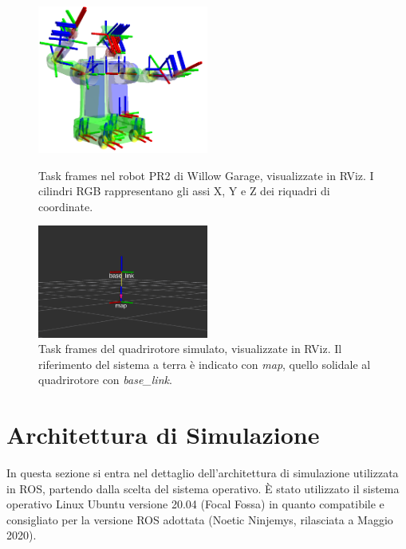 \begin{figure}[H]
	\begin{center}
	
	\includegraphics[width=0.5\textwidth]{gfx/tfROS}
    \caption[Task frames del robot PR2 di Willow Garage, in \acs{RViz}.]{Task frames nel robot PR2 di Willow Garage, visualizzate in \acs{RViz}. I cilindri RGB rappresentano gli assi X, Y e Z dei riquadri di coordinate.}
    \label{fig:tf_ROS}
    
    \vspace{30mm}

	\includegraphics[width=0.5\textwidth]{gfx/ROS/rqt_rviz}
	\caption[Task frames del quadrirotore simulato, in \acs{RViz}.]{Task frames del quadrirotore simulato, visualizzate in \acs{RViz}. Il riferimento del sistema a terra è indicato con \emph{map}, quello solidale al quadrirotore con \emph{base\_link}.}
	\label{fig:droneRviz}
		
	\end{center}
\end{figure}

\pagebreak

\section{Architettura di Simulazione}
In questa sezione si entra nel dettaglio dell'architettura di simulazione utilizzata in \acs{ROS}, partendo dalla scelta del sistema operativo. È stato utilizzato il sistema operativo Linux Ubuntu versione 20.04 (Focal Fossa) in quanto compatibile e consigliato per la versione \acs{ROS} adottata (Noetic Ninjemys, rilasciata a Maggio 2020).

